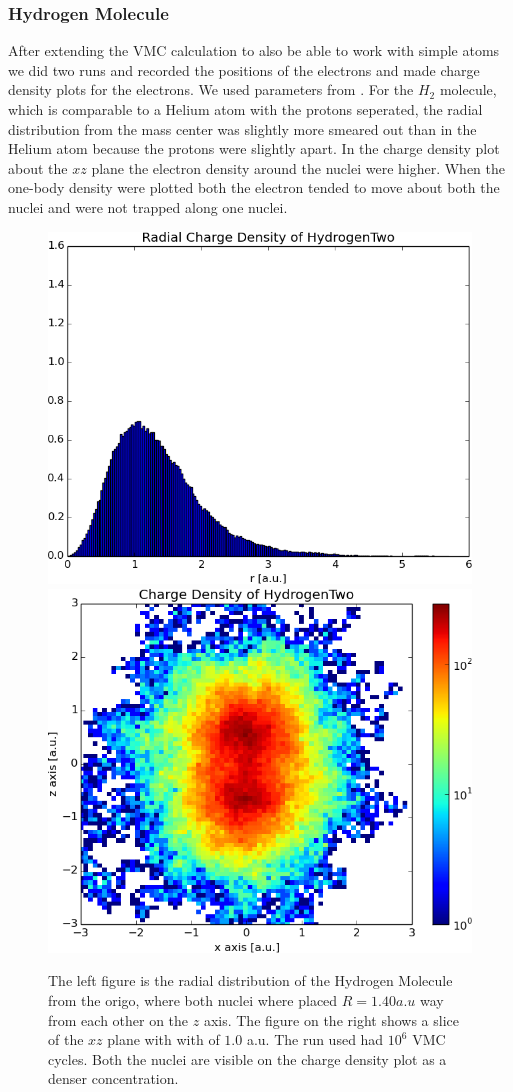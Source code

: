	\subsubsection{Hydrogen Molecule}
		After extending the VMC calculation to also be able to work with simple atoms we did two runs and recorded the positions of the electrons and made charge density plots for the electrons. We used parameters from \cite{Ihle_Ledum}.
		For the \(H_2\) molecule, which is comparable to a Helium atom with the protons seperated, the radial distribution from the mass center was slightly more smeared out than in the Helium atom because the protons were slightly apart.
		In the charge density plot about the \(xz\) plane the electron density around the nuclei were higher. When the one-body density were plotted both the electron tended to move about both the nuclei and were not trapped along one nuclei. 

		\begin{figure}
			\centering \includegraphics[width=0.45\linewidth]{../figures/used/ChargeDensityHydrogenTwo}
			\centering \includegraphics[width=0.45\linewidth]{../figures/used/OneBodyDensityHydrogenTwo}
			\protect\caption{The left figure is the radial distribution of the Hydrogen Molecule from the origo, where both nuclei where placed \(R = 1.40 a.u\) way from each other on the \(z\) axis. The figure on the right shows a slice of the \(xz\) plane with with of \(1.0\) a.u. The run used had $10^6$ VMC cycles. Both the nuclei are visible on the charge density plot as a denser concentration.}
			\label{fig:chargeDensityHydrogenTwo}
		\end{figure}

